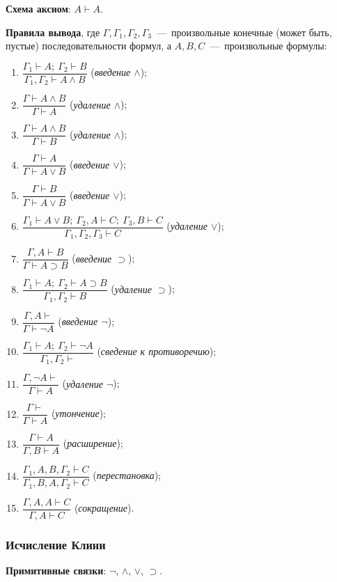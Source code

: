 \textbf{Схема аксиом}: $A \vdash A$.

\textbf{Правила вывода}, где $\Gamma, \Gamma_1, \Gamma_2, \Gamma_3$~---~произвольные конечные (может быть, пустые) последовательности формул, а $A, B, C$~---~произвольные формулы:
\begin{enumerate}[label=\arabic*)]
    \item $\dfrac{\Gamma_1 \vdash A;\ \Gamma_2 \vdash B}{\Gamma_1, \Gamma_2 \vdash A \land B}$ (\textit{введение $\land$});
    \item $\dfrac{\Gamma \vdash A \land B}{\Gamma \vdash A}$ (\textit{удаление $\land$});
    \item $\dfrac{\Gamma \vdash A \land B}{\Gamma \vdash B}$ (\textit{удаление $\land$});
    \item $\dfrac{\Gamma \vdash A}{\Gamma \vdash A \lor B}$ (\textit{введение $\lor$});
    \item $\dfrac{\Gamma \vdash B}{\Gamma \vdash A \lor B}$ (\textit{введение $\lor$});
    \item $\dfrac{\Gamma_1 \vdash A \lor B;\ \Gamma_2, A \vdash C;\ \Gamma_3, B \vdash C}{\Gamma_1, \Gamma_2, \Gamma_3 \vdash C}$ (\textit{удаление $\lor$});
    \item $\dfrac{\Gamma, A \vdash B}{\Gamma \vdash A \supset B}$ (\textit{введение $\supset$});
    \item $\dfrac{\Gamma_1 \vdash A;\ \Gamma_2 \vdash A \supset B}{\Gamma_1, \Gamma_2 \vdash B}$ (\textit{удаление $\supset$});
    \item $\dfrac{\Gamma, A \vdash}{\Gamma \vdash \neg A}$ (\textit{введение $\neg$});
    \item $\dfrac{\Gamma_1 \vdash A;\ \Gamma_2 \vdash \neg A}{\Gamma_1, \Gamma_2 \vdash}$ (\textit{сведение к противоречию});
    \item $\dfrac{\Gamma, \neg A \vdash}{\Gamma \vdash A}$ (\textit{удаление $\neg$});
    \item $\dfrac{\Gamma \vdash}{\Gamma \vdash A}$ (\textit{утончение});
    \item $\dfrac{\Gamma \vdash A}{\Gamma, B \vdash A}$ (\textit{расширение});
    \item $\dfrac{\Gamma_1, A, B, \Gamma_2 \vdash C}{\Gamma_1, B, A, \Gamma_2 \vdash C}$ (\textit{перестановка});
    \item $\dfrac{\Gamma, A, A \vdash C}{\Gamma, A \vdash C}$ (\textit{сокращение}).
\end{enumerate}

\subsubsection{Исчисление Клини}
\textbf{Примитивные связки}: $\neg$, $\land$, $\lor$, $\supset$.

